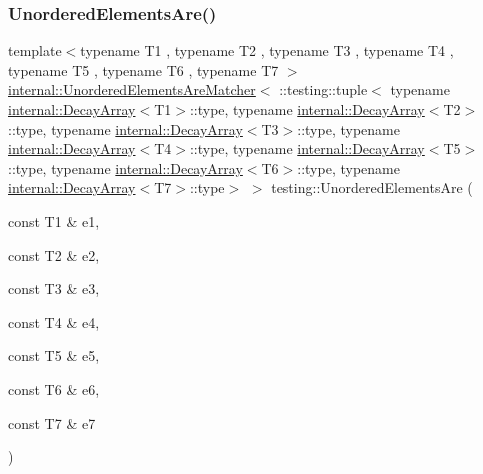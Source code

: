 \subsubsection{\texorpdfstring{Unordered\+Elements\+Are()}{UnorderedElementsAre()}\hspace{0.1cm}{\footnotesize\ttfamily [8/11]}}
{\footnotesize\ttfamily template$<$typename T1 , typename T2 , typename T3 , typename T4 , typename T5 , typename T6 , typename T7 $>$ \\
\hyperlink{classtesting_1_1internal_1_1_unordered_elements_are_matcher}{internal\+::\+Unordered\+Elements\+Are\+Matcher}$<$ \+::testing\+::tuple$<$ typename \hyperlink{structtesting_1_1internal_1_1_decay_array}{internal\+::\+Decay\+Array}$<$T1$>$\+::type, typename \hyperlink{structtesting_1_1internal_1_1_decay_array}{internal\+::\+Decay\+Array}$<$T2$>$\+::type, typename \hyperlink{structtesting_1_1internal_1_1_decay_array}{internal\+::\+Decay\+Array}$<$T3$>$\+::type, typename \hyperlink{structtesting_1_1internal_1_1_decay_array}{internal\+::\+Decay\+Array}$<$T4$>$\+::type, typename \hyperlink{structtesting_1_1internal_1_1_decay_array}{internal\+::\+Decay\+Array}$<$T5$>$\+::type, typename \hyperlink{structtesting_1_1internal_1_1_decay_array}{internal\+::\+Decay\+Array}$<$T6$>$\+::type, typename \hyperlink{structtesting_1_1internal_1_1_decay_array}{internal\+::\+Decay\+Array}$<$T7$>$\+::type$>$ $>$ testing\+::\+Unordered\+Elements\+Are (\begin{DoxyParamCaption}\item[{const T1 \&}]{e1,  }\item[{const T2 \&}]{e2,  }\item[{const T3 \&}]{e3,  }\item[{const T4 \&}]{e4,  }\item[{const T5 \&}]{e5,  }\item[{const T6 \&}]{e6,  }\item[{const T7 \&}]{e7 }\end{DoxyParamCaption})\hspace{0.3cm}{\ttfamily [inline]}}

\mbox{\label{namespacetesting_a0f30358234947d21c7f39f15a8395d04}} 
